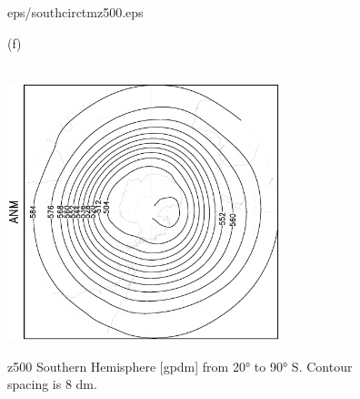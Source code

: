 \documentclass[12pt,a4paper,twoside,openright,headinclude,liststotoc,bibtotoc]{scrreprt}
\begin{document}
\begin{appendix}
\begin{figure}[b]
{{eps/southcirctmz500.eps}
}
\parbox{8.5cm}{\hspace{0.80cm} \begin{scriptsize}(f) \end{scriptsize} \vspace{-0.5cm} \\
\includegraphics[height=7.5cm,angle=-90]
{eps/southcirct21tmz500.eps}
}
\caption[z500 Southern Hemisphere]{z500 Southern Hemisphere [gpdm] from 20° to 90° S. Contour spacing is 8 dm.}
\label{img:z500south}
\end{figure}




\end{appendix}
\end{document}
